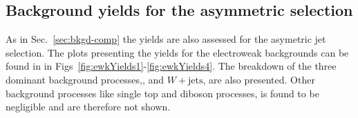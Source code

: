 \clearpage



\subsection{Background yields for the asymmetric selection}


As in Sec.~\ref{sec:bkgd-comp} the yields are also assessed for the asymetric jet selection.
The plots presenting the yields for the electroweak backgrounds can be found in in Figs~\ref{fig:ewkYields1}-\ref{fig:ewkYields4}. 
The breakdown of the three dominant background processes,\zInv , \ttbar and $W+\textrm{jets}$, are also presented. 
Other background processes like single top and diboson processes, is found to be negligible and are therefore not 
shown.

